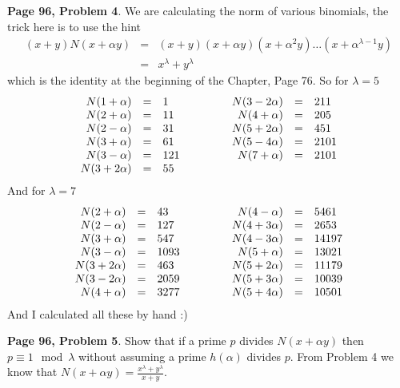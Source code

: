 \documentclass[aps,preprint,preprintnumbers,nofootinbib,showpacs,prd]{revtex4-1}
\newcommand{\nbea}{\begin{eqnarray*}}
\newcommand{\neea}{\end{eqnarray*}}
\begin{document}
{\bf Page 96, Problem 4}. We are calculating the norm of various binomials, the trick here is to use the hint
%
\nbea
(x + y)N(x + \alpha y) & = & (x + y)(x + \alpha y) (x + \alpha^2 y) \dots (x + \alpha^{\lambda-1} y) \\
& = & x^\lambda + y^\lambda
\neea
%
which is the identity at the beginning of the Chapter, Page 76. So for $\lambda = 5$
%
\nbea
\begin{array}{r c l c r c l}
N(1 + \alpha) & = & 1 & ~~~~~~~~ & N(3 -  2\alpha) & = & 211 \\
N(2 + \alpha) & = & 11 & ~~~~~~~~ & N(4 + \alpha) & = & 205 \\
N(2 - \alpha) & = & 31 & ~~~~~~~~ & N(5 + 2\alpha) & = & 451 \\
N(3 + \alpha) & = & 61 & ~~~~~~~~ & N(5 -  4\alpha) & = & 2101 \\
N(3 - \alpha) & = & 121 & ~~~~~~~~ & N(7 + \alpha) & = & 2101 \\
N(3 + 2\alpha) & = & 55 & ~~~~~~~~ & & &
\end{array}
\neea
%
And for $\lambda = 7$
%
\nbea
\begin{array}{r c l c r c l}
N(2 + \alpha) & = & 43 & ~~~~~~~~ & N(4 - \alpha) & = & 5461 \\
N(2 - \alpha) & = & 127 & ~~~~~~~~ & N(4 + 3\alpha) & = & 2653 \\
N(3 + \alpha) & = & 547 & ~~~~~~~~ & N(4 - 3\alpha) & = & 14197 \\
N(3 - \alpha) & = & 1093 & ~~~~~~~~ & N(5 + \alpha) & = & 13021 \\
N(3 + 2\alpha) & = & 463 & ~~~~~~~~ & N(5 + 2\alpha) & = & 11179 \\
N(3 - 2\alpha) & = & 2059 & ~~~~~~~~ & N(5 + 3\alpha) & = & 10039 \\
N(4 + \alpha) & = & 3277 & ~~~~~~~~ & N(5 + 4\alpha) & = & 10501 
\end{array}
\neea
%
And I calculated all these by hand :)

{\bf Page 96, Problem 5}. Show that if a prime $p$ divides $N(x + \alpha y)$ then $p \equiv 1 \mod{\lambda}$ without assuming a prime $h(\alpha)$ divides $p$. From Problem 4 we know that $N(x + \alpha y) = \frac{x^\lambda + y^\lambda}{x + y}$.
\end{document}
